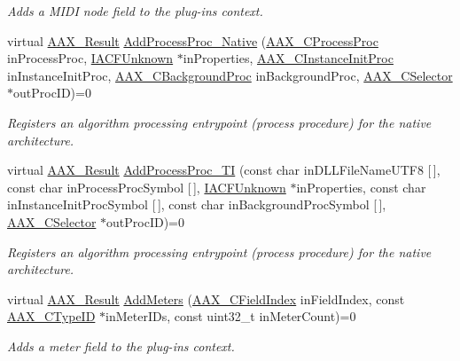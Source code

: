\begin{DoxyCompactItemize}
\begin{DoxyCompactList}\small\item\em Adds a M\+I\+DI node field to the plug-\/in\textquotesingle{}s context. \end{DoxyCompactList}\item 
virtual \mbox{\hyperlink{a00392_a4d8f69a697df7f70c3a8e9b8ee130d2f}{A\+A\+X\+\_\+\+Result}} \mbox{\hyperlink{a01625_a4acfd619cfbd35ffd0ff20ca67bda305}{Add\+Process\+Proc\+\_\+\+Native}} (\mbox{\hyperlink{a00401_ad6dd5e1aa5bd2f8462966685e3b26a6e}{A\+A\+X\+\_\+\+C\+Process\+Proc}} in\+Process\+Proc, \mbox{\hyperlink{a01409}{I\+A\+C\+F\+Unknown}} $\ast$in\+Properties, \mbox{\hyperlink{a00401_a3963a850079d3186e08c97a1a4d0ef1c}{A\+A\+X\+\_\+\+C\+Instance\+Init\+Proc}} in\+Instance\+Init\+Proc, \mbox{\hyperlink{a00401_aa64561d963284a3124a0821e7dc79c9a}{A\+A\+X\+\_\+\+C\+Background\+Proc}} in\+Background\+Proc, \mbox{\hyperlink{a00392_aeaf9b387f902c50a8360ff423f4a1f23}{A\+A\+X\+\_\+\+C\+Selector}} $\ast$out\+Proc\+ID)=0
\begin{DoxyCompactList}\small\item\em Registers an algorithm processing entrypoint (process procedure) for the native architecture. \end{DoxyCompactList}\item 
virtual \mbox{\hyperlink{a00392_a4d8f69a697df7f70c3a8e9b8ee130d2f}{A\+A\+X\+\_\+\+Result}} \mbox{\hyperlink{a01625_ae1d1a2fe050631ab50720d46358e9605}{Add\+Process\+Proc\+\_\+\+TI}} (const char in\+D\+L\+L\+File\+Name\+U\+T\+F8 \mbox{[}$\,$\mbox{]}, const char in\+Process\+Proc\+Symbol \mbox{[}$\,$\mbox{]}, \mbox{\hyperlink{a01409}{I\+A\+C\+F\+Unknown}} $\ast$in\+Properties, const char in\+Instance\+Init\+Proc\+Symbol \mbox{[}$\,$\mbox{]}, const char in\+Background\+Proc\+Symbol \mbox{[}$\,$\mbox{]}, \mbox{\hyperlink{a00392_aeaf9b387f902c50a8360ff423f4a1f23}{A\+A\+X\+\_\+\+C\+Selector}} $\ast$out\+Proc\+ID)=0
\begin{DoxyCompactList}\small\item\em Registers an algorithm processing entrypoint (process procedure) for the native architecture. \end{DoxyCompactList}\item 
virtual \mbox{\hyperlink{a00392_a4d8f69a697df7f70c3a8e9b8ee130d2f}{A\+A\+X\+\_\+\+Result}} \mbox{\hyperlink{a01625_a6b7aec8153fb7243d62284ea504c5681}{Add\+Meters}} (\mbox{\hyperlink{a00392_ae807f8986143820cfb5d6da32165c9c7}{A\+A\+X\+\_\+\+C\+Field\+Index}} in\+Field\+Index, const \mbox{\hyperlink{a00392_ac678f9c1fbcc26315d209f71a147a175}{A\+A\+X\+\_\+\+C\+Type\+ID}} $\ast$in\+Meter\+I\+Ds, const uint32\+\_\+t in\+Meter\+Count)=0
\begin{DoxyCompactList}\small\item\em Adds a meter field to the plug-\/in\textquotesingle{}s context. \end{DoxyCompactList}\end{DoxyCompactItemize}



